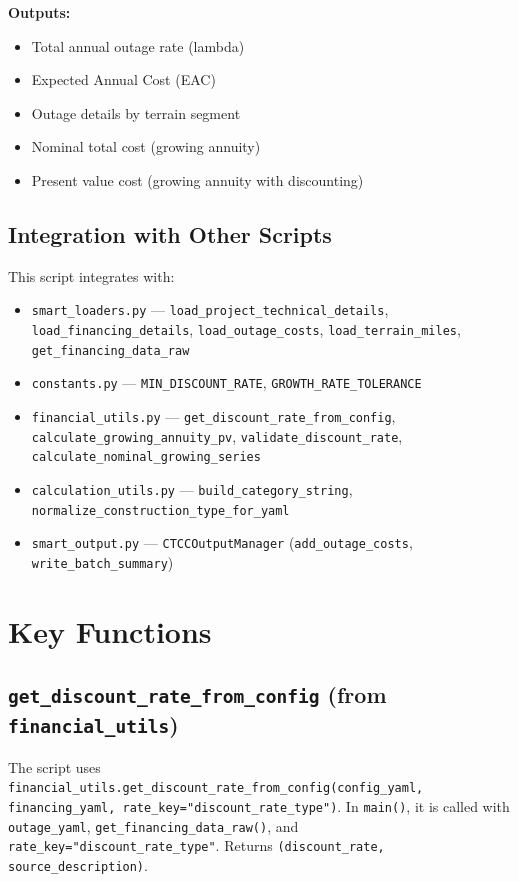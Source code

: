\documentclass[ctcc_full_documentation.tex]{subfiles}
\begin{document}
\textbf{Outputs:}
\begin{itemize}
    \item Total annual outage rate (lambda)
    \item Expected Annual Cost (EAC)
    \item Outage details by terrain segment
    \item Nominal total cost (growing annuity)
    \item Present value cost (growing annuity with discounting)
\end{itemize}

\subsection{Integration with Other Scripts}

This script integrates with:
\begin{itemize}
    \item \texttt{smart\_loaders.py} --- \texttt{load\_project\_technical\_details}, \texttt{load\_financing\_details}, \texttt{load\_outage\_costs}, \texttt{load\_terrain\_miles}, \texttt{get\_financing\_data\_raw}
    \item \texttt{constants.py} --- \texttt{MIN\_DISCOUNT\_RATE}, \texttt{GROWTH\_RATE\_TOLERANCE}
    \item \texttt{financial\_utils.py} --- \texttt{get\_discount\_rate\_from\_config}, \texttt{calculate\_growing\_annuity\_pv}, \texttt{validate\_discount\_rate}, \texttt{calculate\_nominal\_growing\_series}
    \item \texttt{calculation\_utils.py} --- \texttt{build\_category\_string}, \texttt{normalize\_construction\_type\_for\_yaml}
    \item \texttt{smart\_output.py} --- \texttt{CTCCOutputManager} (\texttt{add\_outage\_costs}, \texttt{write\_batch\_summary})
\end{itemize}

\section{Key Functions}

\subsection{\texttt{get\_discount\_rate\_from\_config} (from \texttt{financial\_utils})}

The script uses \texttt{financial\_utils.get\_discount\_rate\_from\_config(config\_yaml, financing\_yaml, rate\_key="discount\_rate\_type")}. In \texttt{main()}, it is called with \texttt{outage\_yaml}, \texttt{get\_financing\_data\_raw()}, and \texttt{rate\_key="discount\_rate\_type"}. Returns \texttt{(discount\_rate, source\_description)}.
\end{document}
